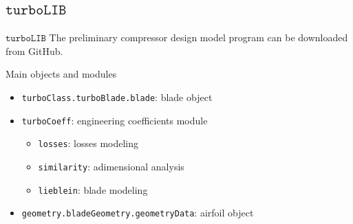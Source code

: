 \subsection{$\mathtt{turboLIB}$}
	\begin{frame}[fragile]{$\mathtt{turboLIB}$}
		The preliminary compressor design model program \href{https://github.com/antoniopucciarelli/turboLIB}{} can be downloaded from GitHub.
		\begin{block}{Main objects and modules}
			\begin{itemize}
				\item \verb|turboClass.turboBlade.blade|: blade object
				\item \verb|turboCoeff|: engineering coefficients module
					\begin{itemize}
						\item \verb|losses|: losses modeling 
						\item \verb|similarity|: adimensional analysis
						\item \verb|lieblein|: blade modeling
					\end{itemize}
				\item \verb|geometry.bladeGeometry.geometryData|: airfoil object
			\end{itemize}
		\end{block}
	\end{frame}

